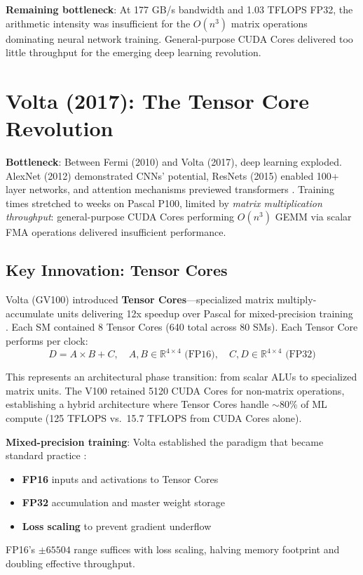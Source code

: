 \documentclass{article}
\begin{document}
\textbf{Remaining bottleneck}: At 177 GB/s bandwidth and 1.03 TFLOPS FP32, the arithmetic intensity was insufficient for the $O(n^3)$ matrix operations dominating neural network training. General-purpose CUDA Cores delivered too little throughput for the emerging deep learning revolution.

\section{Volta (2017): The Tensor Core Revolution}

\textbf{Bottleneck}: Between Fermi (2010) and Volta (2017), deep learning exploded. AlexNet (2012) demonstrated CNNs' potential, ResNets (2015) enabled 100+ layer networks, and attention mechanisms previewed transformers \cite{bahdanau2014neural}. Training times stretched to weeks on Pascal P100, limited by \textit{matrix multiplication throughput}: general-purpose CUDA Cores performing $O(n^3)$ GEMM via scalar FMA operations delivered insufficient performance.

\subsection{Key Innovation: Tensor Cores}

Volta (GV100) introduced \textbf{Tensor Cores}—specialized matrix multiply-accumulate units delivering 12x speedup over Pascal for mixed-precision training \cite{nvidia2017volta}. Each SM contained 8 Tensor Cores (640 total across 80 SMs). Each Tensor Core performs per clock:
\begin{equation}
D = A \times B + C, \quad A, B \in \mathbb{R}^{4\times4}\text{ (FP16)},\quad C, D \in \mathbb{R}^{4\times4}\text{ (FP32)}
\end{equation}

This represents an architectural phase transition: from scalar ALUs to specialized matrix units. The V100 retained 5120 CUDA Cores for non-matrix operations, establishing a hybrid architecture where Tensor Cores handle $\sim$80\% of ML compute (125 TFLOPS vs.\ 15.7 TFLOPS from CUDA Cores alone).

\textbf{Mixed-precision training}: Volta established the paradigm that became standard practice \cite{micikevicius2017mixed}:
\begin{itemize}
\item \textbf{FP16} inputs and activations to Tensor Cores
\item \textbf{FP32} accumulation and master weight storage
\item \textbf{Loss scaling} to prevent gradient underflow
\end{itemize}
FP16's $\pm 65504$ range suffices with loss scaling, halving memory footprint and doubling effective throughput.
\end{document}
